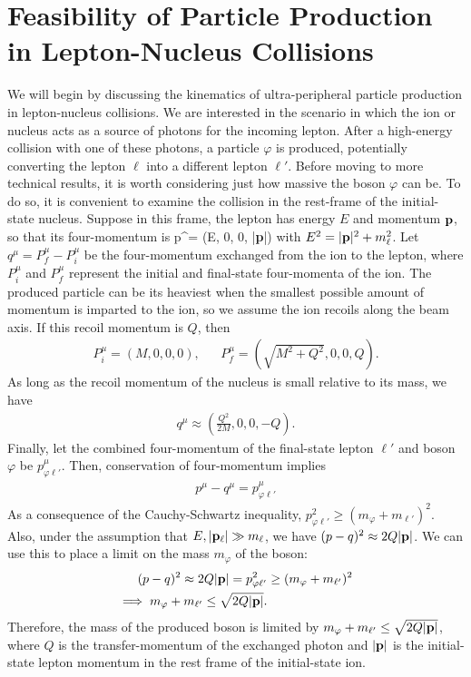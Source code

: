 \section{Feasibility of Particle Production in Lepton-Nucleus Collisions}\label{sec:feasibility}
We will begin by discussing the kinematics of ultra-peripheral particle production in lepton-nucleus collisions. We are interested in the scenario in which the ion or nucleus acts as a source of photons for the incoming lepton. After a high-energy collision with one of these photons, a particle $\varphi$ is produced, potentially converting the lepton $\ell$ into a different lepton $\ell'$. Before moving to more technical results, it is worth considering just how massive the boson $\varphi$ can be. To do so, it is convenient to examine the collision in the rest-frame of the initial-state nucleus. Suppose in this frame, the lepton has energy $E$ and momentum ${\bf p}$, so that its four-momentum is
\beq
    p^\mu = \left(E, 0, 0, |{\bf p}|\right)
\eeq
with $E^2 = |{\bf p}|^2 + m_\ell^2$. Let $q^\mu = P_f^\mu- P_i^\mu$ be the four-momentum exchanged from the ion to the lepton, where $P_i^\mu$ and $P_f^\mu$ represent the initial and final-state four-momenta of the ion. The produced particle can be its heaviest when the smallest possible amount of momentum is imparted to the ion, so we assume the ion recoils along the beam axis. If this recoil momentum is $Q$, then
\begin{align}
    P_i^\mu = (M, 0, 0, 0), & & P_f^\mu = (\sqrt{M^2+Q^2}, 0, 0, Q).
\end{align}
As long as the recoil momentum of the nucleus is small relative to its mass,  we have 
\begin{align}
    q^\mu \approx \left(\frac{Q^2}{2M}, 0, 0, -Q\right).
\end{align}
Finally, let the combined four-momentum of the final-state lepton $\ell'$ and boson $\varphi$ be $p_{\varphi \ell'}^\mu$. Then, conservation of four-momentum implies
\begin{align}
    p^\mu - q^\mu = p_{\varphi\ell'}^\mu
\end{align}
As a consequence of the Cauchy-Schwartz inequality, $p_{\varphi\ell'}^2 \geq (m_\varphi + m_{\ell'})^2$. Also, under the assumption that $E, |{\bf p}_\ell|\gg m_\ell$, we have $(p - q)^2 \approx 2Q|{\bf p}|$. We can use this to place a limit on the mass $m_\varphi$ of the boson:
\begin{align}
    (p - q)^2 \approx 2Q|{\bf p}| = p_{\varphi \ell'}^2   &\geq (m_\varphi + m_{\ell'})^2\\
    \implies m_\varphi + m_{\ell'} \leq \sqrt{2Q|{\bf p}|}.
\end{align}
Therefore, the mass of the produced  boson is limited by $m_\varphi + m_{\ell'} \leq \sqrt{2Q|{\bf p}|}$, where $Q$ is the transfer-momentum of the exchanged photon and $|{\bf p}|$ is the initial-state lepton momentum in the rest frame of the initial-state ion. 

